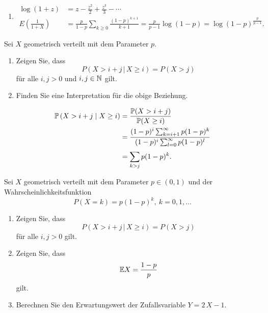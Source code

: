 \solution
\begin{enumerate}
    \item \begin{align*}
            \log (1+z) &= z - \frac{z^2}{2} + \frac{z^3}{3} - \cdots \\
            E \left( \frac{1}{1+X} \right) &= \frac{p}{1-p} \sum_{k\geq 0} \frac{(1-p)^{k+1}}{k+1}
            = \frac{p}{p-1} \log \left( 1-p \right) = \log (1-p)^{\frac{p}{p-1}}. 
        \end{align*}

\end{enumerate}

 Sei $X$ geometrisch
verteilt mit dem Parameter $p$.
\begin{enumerate}
    \item Zeigen Sie, dass 
        \begin{equation*}
            P \left( X > i+j \,|\, X \geq i \right) = P\left( X > j \right) 
        \end{equation*}
        für alle $i,j>0$ und $i,j\in\mathbb N$ gilt.

    \item Finden Sie eine Interpretation für die obige Beziehung.
\end{enumerate}

\solution 
\begin{align*}
    \mathbb P\left( X > i+j \;\middle\vert\; X \geq i \right) &= \frac{\mathbb P(X > i+j)}{\mathbb P(X \geq i)} \\
    &= \frac{  (1-p)^{i} \sum_{k=i+1}^{\infty} p(1-p)^{k} }{ (1-p)^{i} \sum_{l=0}^{\infty} p(1-p)^{l} } \\
    &= \sum_{k > j}^{} p(1-p)^k.
\end{align*}


 Sei 
$X$ geometrisch verteilt mit dem Parameter $p\in (0,1)$ und der 
Wahrscheinlichkeitsfunktion
\begin{equation*}
    P(X = k) = p(1-p)^{k}, \ k=0,1,\dots
\end{equation*}
\begin{enumerate}
    \item Zeigen Sie, dass
        \begin{equation*}
            P( X > i+j \,|\, X \geq i) = P(X > j)
        \end{equation*}
        für alle $i,j>0$ gilt.
    \item Zeigen Sie, dass 
        \begin{align*}
            \mathbb{E} X = \frac{1-p}{p}
        \end{align*}
        gilt.
    \item Berechnen Sie den Erwartungswert der Zufallsvariable $Y=2\,X -1$.
\end{enumerate}



